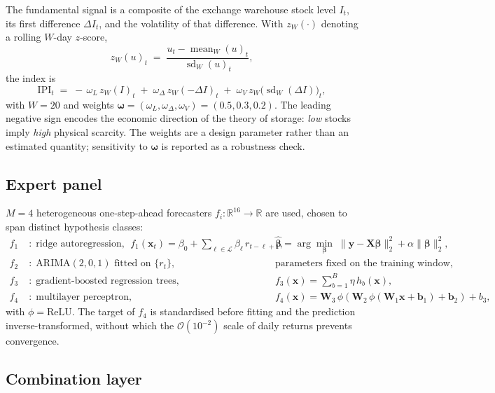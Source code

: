 The fundamental signal is a composite of the exchange warehouse stock level $I_t$,
its first difference $\Delta I_t$, and the volatility of that difference. With
$z_W(\cdot)$ denoting a rolling $W$-day $z$-score,
\begin{equation}
z_W(u)_t \;=\; \frac{u_t - \operatorname{mean}_W(u)_t}{\operatorname{sd}_W(u)_t},
\end{equation}
the index is
\begin{equation}
\label{eq:ipi}
\mathrm{IPI}_t \;=\;
-\,\omega_L\, z_W(I)_t
\;+\; \omega_\Delta\, z_W(-\Delta I)_t
\;+\; \omega_V\, z_W\!\big(\operatorname{sd}_W(\Delta I)\big)_t ,
\end{equation}
with $W=20$ and weights $\bm{\omega}=(\omega_L,\omega_\Delta,\omega_V)=(0.5,0.3,0.2)$.
The leading negative sign encodes the economic direction of the theory of storage:
\emph{low} stocks imply \emph{high} physical scarcity. The weights are a design
parameter rather than an estimated quantity; sensitivity to $\bm{\omega}$ is
reported as a robustness check.

\subsection{Expert panel}

$M=4$ heterogeneous one-step-ahead forecasters $f_i:\mathbb{R}^{16}\to\mathbb{R}$
are used, chosen to span distinct hypothesis classes:
\begin{align}
f_1 \;&:\; \text{ridge autoregression, } \; \textstyle f_1(\bm{x}_t)=\beta_0+\sum_{\ell\in\mathcal{L}}\beta_\ell\, r_{t-\ell+1},
&& \hat{\bm\beta}=\arg\min_{\bm\beta}\;\lVert \bm{y}-\bm{X}\bm\beta\rVert_2^2+\alpha\lVert\bm\beta\rVert_2^2 ,\\
f_2 \;&:\; \text{ARIMA}(2,0,1) \text{ fitted on } \{r_t\}, && \text{parameters fixed on the training window},\\
f_3 \;&:\; \text{gradient-boosted regression trees}, && \textstyle f_3(\bm{x})=\sum_{b=1}^{B}\eta\, h_b(\bm{x}),\\
f_4 \;&:\; \text{multilayer perceptron}, && f_4(\bm{x})=\bm{W}_3\,\phi(\bm{W}_2\,\phi(\bm{W}_1\bm{x}+\bm{b}_1)+\bm{b}_2)+b_3 ,
\end{align}
with $\phi=\mathrm{ReLU}$. The target of $f_4$ is standardised before fitting and
the prediction inverse-transformed, without which the $\mathcal{O}(10^{-2})$ scale
of daily returns prevents convergence.

\subsection{Combination layer}

